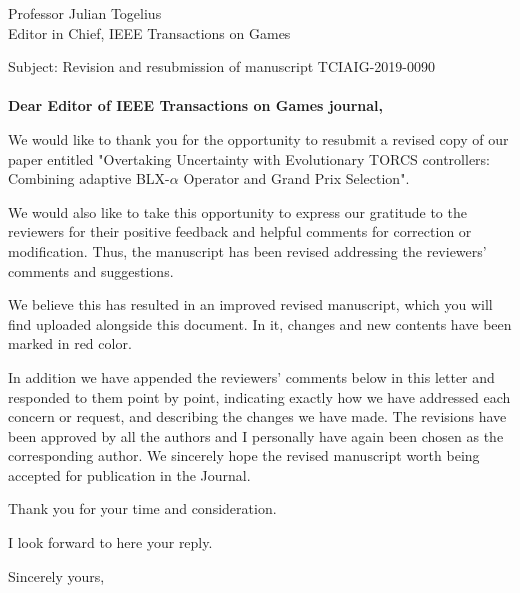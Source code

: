 \documentclass[10pt]{letter} %
\begin{document}

\begin{letter}{Professor Julian Togelius \\ Editor in Chief, IEEE Transactions on Games} %

\opening{Subject: Revision and resubmission of manuscript TCIAIG-2019-0090\\
	\\	
\textbf{Dear Editor of  IEEE Transactions on Games journal,}}


We would like to thank you for the opportunity to resubmit a revised copy of our paper entitled "Overtaking Uncertainty with Evolutionary TORCS controllers: Combining adaptive BLX-$\alpha$ Operator and Grand Prix Selection". 

We would also like to take this opportunity to express our gratitude to the reviewers for their positive feedback and helpful comments for correction or modification. Thus, the manuscript has been revised addressing the reviewers' comments and suggestions.


We believe this has resulted in an improved revised manuscript, which you will find uploaded alongside this document. In it, changes and new contents have been marked in red color.

In addition we have appended the reviewers' comments below in this letter and responded to them point by point, indicating exactly how we have addressed each concern or request, and describing the changes we have made. The revisions have been approved by all the authors and I personally have again been chosen as the corresponding author. 
We sincerely hope the revised manuscript worth being accepted for publication in the Journal.

Thank you for your time and consideration.

I look forward to here your reply.

\vspace{2\parskip} %
\closing{Sincerely yours,}
\vspace{2\parskip} %


\end{letter}
\end{document}
